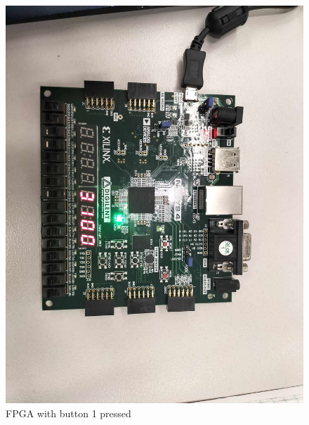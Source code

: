 \documentclass[12pt,a4paper]{article}
\begin{document}
\begin{figure}[H]
    \centering
    \includegraphics[scale=0.25]{images/fpga_1.jpg}
    \caption{FPGA with button 1 pressed}
    \label{fig:fpga_1}
\end{figure}
\end{document}
